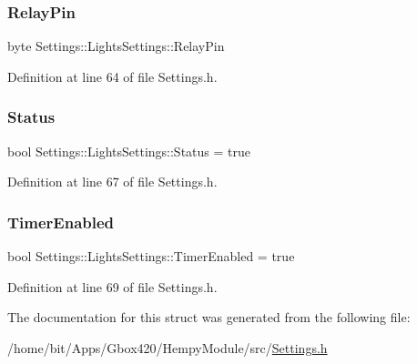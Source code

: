 \subsubsection{\texorpdfstring{Relay\+Pin}{RelayPin}}
{\footnotesize\ttfamily byte Settings\+::\+Lights\+Settings\+::\+Relay\+Pin}



Definition at line 64 of file Settings.\+h.

\mbox{\label{struct_settings_1_1_lights_settings_ae71c9b08249612f3ff26599004d189e6}} 
\subsubsection{\texorpdfstring{Status}{Status}}
{\footnotesize\ttfamily bool Settings\+::\+Lights\+Settings\+::\+Status = true}



Definition at line 67 of file Settings.\+h.

\mbox{\label{struct_settings_1_1_lights_settings_a4ef1e968d6946baa04bceefaba3f66d3}} 
\subsubsection{\texorpdfstring{Timer\+Enabled}{TimerEnabled}}
{\footnotesize\ttfamily bool Settings\+::\+Lights\+Settings\+::\+Timer\+Enabled = true}



Definition at line 69 of file Settings.\+h.



The documentation for this struct was generated from the following file\+:\begin{DoxyCompactItemize}
\item 
/home/bit/\+Apps/\+Gbox420/\+Hempy\+Module/src/\hyperlink{_hempy_module_2src_2_settings_8h}{Settings.\+h}\end{DoxyCompactItemize}
